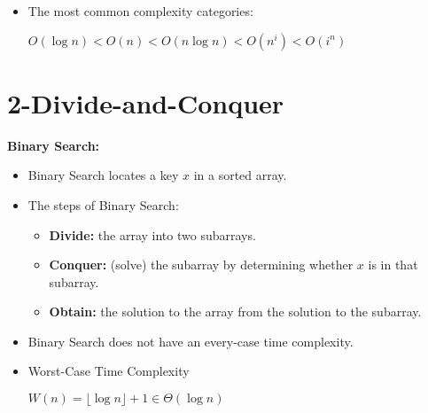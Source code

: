 \documentclass{../cheat}
\begin{document}
\begin{multicols}{3}
\begin{itemize}[nolistsep, leftmargin=1em]
		\item The most common complexity categories:\\
		\centerline{$O(\log n) < O(n) < O(n \log n) < O(n^i) < O(i^n) $}
	\end{itemize}
	


\section{2-Divide-and-Conquer}
		\textbf{Binary Search:}
		\begin{itemize}
			\item Binary Search locates a key $x$ in a sorted array.
			\item The steps of Binary Search:
			\begin{itemize}[nolistsep, leftmargin=1em]
				\item \textbf{Divide:} the array into two subarrays.
				\item \textbf{Conquer:} (solve) the subarray by determining whether $x$ is in that subarray.
				\item \textbf{Obtain:} the solution to the array from the solution to the subarray. 
			\end{itemize}
			\item Binary Search does not have an every-case time complexity. 
			\item Worst-Case Time Complexity\\
				\centerline{ $W(n) = \lfloor \log n \rfloor + 1 \in \Theta(\log n)$ }
		\end{itemize}


\end{multicols}
\end{document}
